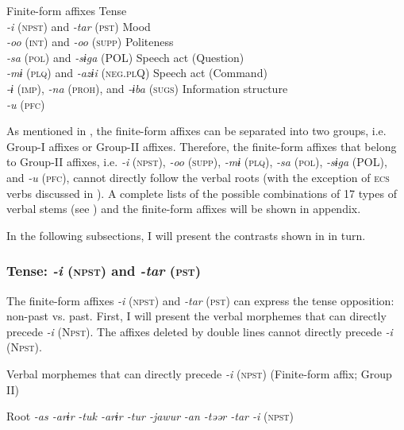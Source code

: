 \ea\label{ex:8-52}
  Finite-form affixes
    \ea Tense\\
        \textit{-i} (\textsc{npst}) and \textit{-tar} (\textsc{pst})
    \ex Mood\\
        \textit{-oo} (\textsc{int}) and \textit{-oo} (\textsc{supp})
    \ex Politeness\\
        \textit{-sa} (\textsc{pol}) and \textit{-sɨga} (POL)
    \ex Speech act (Question)\\
        \textit{-mɨ} (\textsc{plq}) and \textit{-azɨi} (\textsc{neg}.\textsc{pl}Q)
    \ex Speech act (Command)\\
        \textit{-ɨ} (\textsc{imp}), \textit{-na} (\textsc{proh}), and \textit{-ɨba} (\textsc{sugs})
    \ex Information structure\\
        \textit{-u} (\textsc{pfc})
    \z
\z

As mentioned in , the finite-form affixes can be separated into two groups, i.e. Group-I affixes or Group-II affixes. Therefore, the finite-form affixes that belong to Group-II affixes, i.e. \textit{-i} (\textsc{npst}), \textit{-oo} (\textsc{supp}), \textit{-mɨ} (\textsc{plq}), \textit{-sa} (\textsc{pol}), \textit{-sɨga} (POL), and \textit{-u} (\textsc{pfc}), cannot directly follow the verbal roots (with the exception of \textsc{ecs} verbs discussed in ). A complete lists of the possible combinations of 17 types of verbal stems (see ) and the finite-form affixes will be shown in appendix.

In the following subsections, I will present the contrasts shown in  in turn.

\subsubsection{Tense: \textit{-i} (\textsc{npst}) and \textit{-tar} (\textsc{pst})}

The finite-form affixes \textit{-i} (\textsc{npst}) and \textit{-tar} (\textsc{pst}) can express the tense opposition: non-past vs. past. First, I will present the verbal morphemes that can directly precede \textit{-i} (N\textsc{pst}). The affixes deleted by double lines cannot directly precede \textit{-i} (N\textsc{pst}).

\ea\label{ex:8-53}
  Verbal morphemes that can directly precede \textit{-i} (\textsc{npst}) (Finite-form affix; Group II)

  Root  \textit{-as  -arɨr} %
\textit{-tuk  -arɨr  -tur  -jawur} %
\textit{-an  -təər  -tar  -i} (\textsc{npst})

